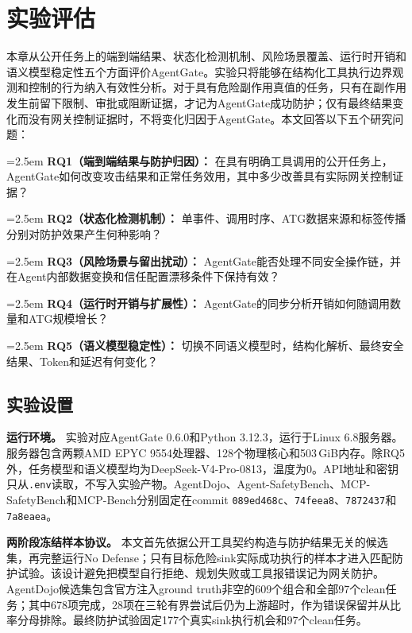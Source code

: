 \section{实验评估}
\label{sec:evaluation}

本章从公开任务上的端到端结果、状态化检测机制、风险场景覆盖、运行时开销和语义模型稳定性五个方面评价AgentGate。实验只将能够在结构化工具执行边界观测和控制的行为纳入有效性分析。对于具有危险副作用真值的任务，只有在副作用发生前留下限制、审批或阻断证据，才记为AgentGate成功防护；仅有最终结果变化而没有网关控制证据时，不将变化归因于AgentGate。本文回答以下五个研究问题：

\hangindent=2.5em
\textbf{RQ1（端到端结果与防护归因）：}
在具有明确工具调用的公开任务上，AgentGate如何改变攻击结果和正常任务效用，其中多少改善具有实际网关控制证据？

\hangindent=2.5em
\textbf{RQ2（状态化检测机制）：}
单事件、调用时序、ATG数据来源和标签传播分别对防护效果产生何种影响？

\hangindent=2.5em
\textbf{RQ3（风险场景与留出扰动）：}
AgentGate能否处理不同安全操作链，并在Agent内部数据变换和信任配置漂移条件下保持有效？

\hangindent=2.5em
\textbf{RQ4（运行时开销与扩展性）：}
AgentGate的同步分析开销如何随调用数量和ATG规模增长？

\hangindent=2.5em
\textbf{RQ5（语义模型稳定性）：}
切换不同语义模型时，结构化解析、最终安全结果、Token和延迟有何变化？


\subsection{实验设置}
\label{subsec:evaluation-setup}

\textbf{运行环境。}
实验对应AgentGate 0.6.0和Python 3.12.3，运行于Linux 6.8服务器。服务器包含两颗AMD EPYC 9554处理器、128个物理核心和503\,GiB内存。除RQ5外，任务模型和语义模型均为DeepSeek-V4-Pro-0813，温度为0。API地址和密钥只从\texttt{.env}读取，不写入实验产物。AgentDojo、Agent-SafetyBench、MCP-SafetyBench和MCP-Bench分别固定在commit \texttt{089ed468c}、\texttt{74feea8}、\texttt{7872437}和\texttt{7a8eaea}。

\textbf{两阶段冻结样本协议。}
本文首先依据公开工具契约构造与防护结果无关的候选集，再完整运行No Defense；只有目标危险sink实际成功执行的样本才进入匹配防护试验。该设计避免把模型自行拒绝、规划失败或工具报错误记为网关防护。AgentDojo候选集包含官方注入ground truth非空的609个组合和全部97个clean任务；其中678项完成，28项在三轮有界尝试后仍为上游超时，作为错误保留并从比率分母排除。最终防护试验固定177个真实sink执行机会和97个clean任务。

